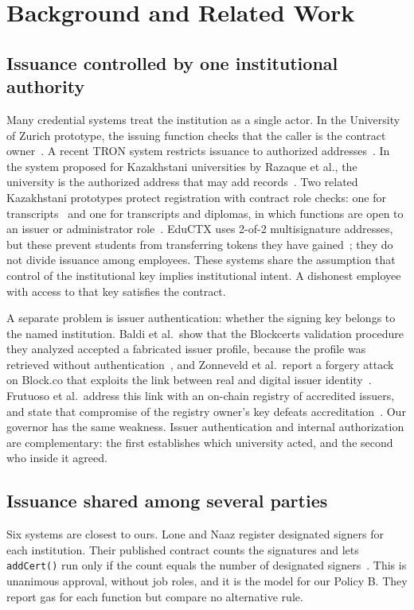 \section{Background and Related Work}\label{sec:related}

\subsection{Issuance controlled by one institutional authority}
Many credential systems treat the institution as a single actor. In the University of Zurich prototype, the issuing function checks that the caller is the contract owner~\cite{gresch2019}. A recent TRON system restricts issuance to authorized addresses~\cite{andrade2025}. In the system proposed for Kazakhstani universities by Razaque et al., the university is the authorized address that may add records~\cite{razaque2025}. Two related Kazakhstani prototypes protect registration with contract role checks: one for transcripts~\cite{ussatova2026a} and one for transcripts and diplomas, in which functions are open to an issuer or administrator role~\cite{ussatova2026b}. EduCTX uses 2-of-2 multisignature addresses, but these prevent students from transferring tokens they have gained~\cite{turkanovic2018}; they do not divide issuance among employees. These systems share the assumption that control of the institutional key implies institutional intent. A dishonest employee with access to that key satisfies the contract.

A separate problem is issuer authentication: whether the signing key belongs to the named institution. Baldi et al.\ show that the Blockcerts validation procedure they analyzed accepted a fabricated issuer profile, because the profile was retrieved without authentication~\cite{baldi2019}, and Zonneveld et al.\ report a forgery attack on Block.co that exploits the link between real and digital issuer identity~\cite{zonneveld2026}. Frutuoso et al.\ address this link with an on-chain registry of accredited issuers, and state that compromise of the registry owner's key defeats accreditation~\cite{frutuoso2026}. Our governor has the same weakness. Issuer authentication and internal authorization are complementary: the first establishes which university acted, and the second who inside it agreed.

\subsection{Issuance shared among several parties}
Six systems are closest to ours. Lone and Naaz register designated signers for each institution. Their published contract counts the signatures and lets \texttt{addCert()} run only if the count equals the number of designated signers~\cite{lone2020}. This is unanimous approval, without job roles, and it is the model for our Policy B. They report gas for each function but compare no alternative rule.

